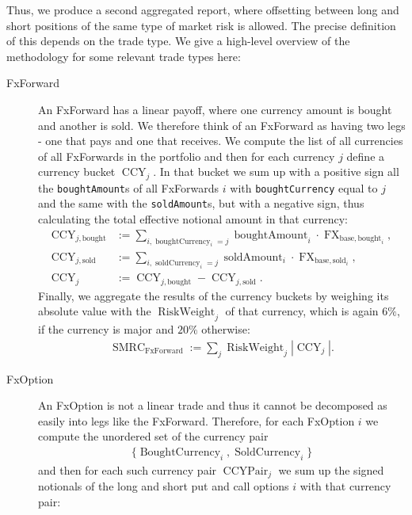 Thus, we produce a second aggregated report, where offsetting between long and short positions of the same type of market risk is allowed. The precise definition of this depends on the trade type. We give a high-level overview of the methodology for some relevant trade types here:

\begin{description}
	\item[FxForward] An FxForward has a linear payoff, where one currency amount is bought and another is sold. We therefore think of an FxForward as having two legs - one that pays and one that receives. We compute the list of all currencies of all FxForwards in the portfolio and then for each currency $j$ define a currency bucket $\operatorname{CCY}_j$. In that bucket we sum up with a positive sign all the \texttt{boughtAmount}s of all FxForwards $i$ with \texttt{boughtCurrency} equal to $j$ and the same with the \texttt{soldAmount}s, but with a negative sign, thus calculating the total effective notional amount in that currency:
	\begin{align*}
		\operatorname{CCY}_{j,\text{bought}} & := \sum_{i, \operatorname{boughtCurrency}_i=j}{\operatorname{boughtAmount}_i \cdot \operatorname{FX}_{\text{base},\text{bought}_i}}, \\
		\operatorname{CCY}_{j,\text{sold}} & :=\sum_{i, \operatorname{soldCurrency}_i=j}{\operatorname{soldAmount}_i \cdot \operatorname{FX}_{\text{base},\text{sold}_i}}, \\
		\operatorname{CCY}_{j} &:= \operatorname{CCY}_{j,\text{bought}} - \operatorname{CCY}_{j,\text{sold}}.
	\end{align*}
	Finally, we aggregate the results of the currency buckets by weighing its absolute value with the $\operatorname{RiskWeight}_j$ of that currency, which is again $6\%$, if the currency is major and $20\%$ otherwise:
	\begin{align*}
		\operatorname{SMRC}_{\text{FxForward}} := \sum_{j}{\operatorname{RiskWeight}_j |\operatorname{CCY}_j|}.
	\end{align*}
	\item[FxOption] An FxOption is not a linear trade and thus it cannot be decomposed as easily into legs like the FxForward. Therefore, for each FxOption $i$ we compute the unordered set of the currency pair 
	\begin{align*}
		\{ \operatorname{BoughtCurrency}_i, \operatorname{SoldCurrency}_i \}
	\end{align*}
	and then for each such currency pair $\operatorname{CCYPair}_j$ we sum up the signed notionals of the long and short put and call options $i$ with that currency pair:

\end{description}
